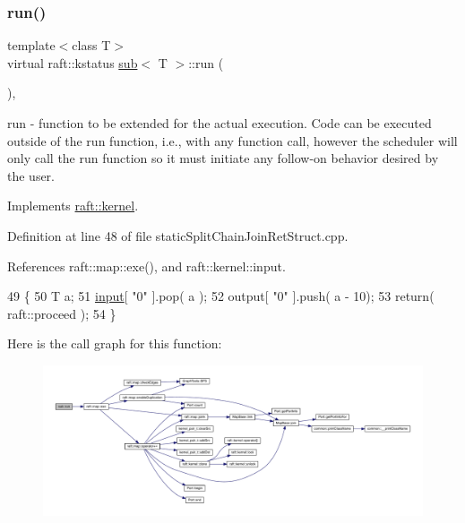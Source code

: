 \subsubsection{\texorpdfstring{run()}{run()}\hspace{0.1cm}{\footnotesize\ttfamily [3/12]}}
{\footnotesize\ttfamily template$<$class T$>$ \\
virtual raft\+::kstatus \hyperlink{classsub}{sub}$<$ T $>$\+::run (\begin{DoxyParamCaption}{ }\end{DoxyParamCaption})\hspace{0.3cm}{\ttfamily [inline]}, {\ttfamily [virtual]}}

run -\/ function to be extended for the actual execution. Code can be executed outside of the run function, i.\+e., with any function call, however the scheduler will only call the run function so it must initiate any follow-\/on behavior desired by the user. 

Implements \hyperlink{classraft_1_1kernel_a05094286d7577360fb1b91c91fc05901}{raft\+::kernel}.



Definition at line 48 of file static\+Split\+Chain\+Join\+Ret\+Struct.\+cpp.



References raft\+::map\+::exe(), and raft\+::kernel\+::input.


\begin{DoxyCode}
49     \{
50         T a;
51         \hyperlink{classraft_1_1kernel_a6edbe35a56409d402e719b3ac36d6554}{input}[ \textcolor{stringliteral}{"0"} ].pop( a );
52         output[ \textcolor{stringliteral}{"0"} ].push( a - 10);
53         \textcolor{keywordflow}{return}( raft::proceed );
54     \}
\end{DoxyCode}
Here is the call graph for this function\+:
\nopagebreak
\begin{figure}[H]
\begin{center}
\leavevmode
\includegraphics[width=350pt]{classsub_a0a0c7461433ee8b5f4b24305282bf69a_cgraph}
\end{center}
\end{figure}
\hypertarget{classsub_a0a0c7461433ee8b5f4b24305282bf69a}{}\label{classsub_a0a0c7461433ee8b5f4b24305282bf69a} 
